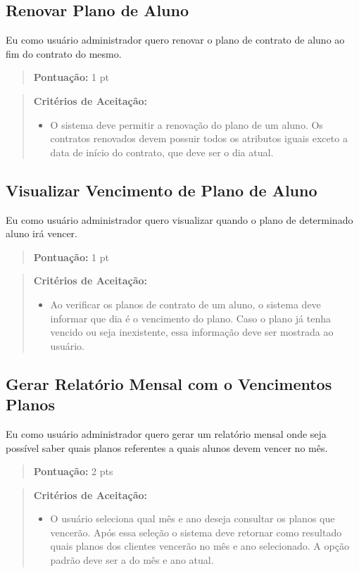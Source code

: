 \subsection[Renovar Plano de Aluno]{Renovar Plano de Aluno}
Eu como usuário administrador quero renovar o plano de contrato de aluno ao fim do contrato do mesmo.
\begin{quote}
    \textbf{Pontuação:} 1 pt
\end{quote}
\begin{quote}
\textbf{Critérios de Aceitação:}
    \begin{itemize}
        \item O sistema deve permitir a renovação do plano de um aluno.  Os contratos renovados devem possuir todos os atributos iguais exceto a data de início do contrato, que deve ser o dia atual.
    \end{itemize}
\end{quote}

\subsection[Visualizar Vencimento de Plano de Aluno]{Visualizar Vencimento de Plano de Aluno}
Eu como usuário administrador quero visualizar quando o plano de determinado
aluno irá vencer.
\begin{quote}
    \textbf{Pontuação:} 1 pt
\end{quote}
\begin{quote}
\textbf{Critérios de Aceitação:}
    \begin{itemize}
        \item Ao verificar os planos de contrato de um aluno, o sistema deve informar que dia é o vencimento do plano. Caso o plano já tenha vencido ou seja inexistente, essa informação deve ser mostrada ao usuário.
    \end{itemize}
\end{quote}

\subsection[Gerar Relatório Mensal com o Vencimentos Planos]{Gerar Relatório Mensal com o Vencimentos Planos}
Eu como usuário administrador quero gerar um relatório mensal onde seja possível
saber quais planos referentes a quais alunos devem vencer no mês.
\begin{quote}
    \textbf{Pontuação:} 2 pts
\end{quote}
\begin{quote}
\textbf{Critérios de Aceitação:}
    \begin{itemize}
        \item O usuário seleciona qual mês e ano deseja consultar os planos que vencerão. Após essa seleção o sistema deve retornar como resultado quais planos dos clientes vencerão no mês e ano selecionado. A opção padrão deve ser a do mês e ano atual.
    \end{itemize}
\end{quote}

